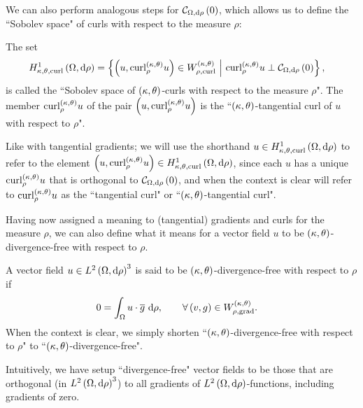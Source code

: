 We can also perform analogous steps for $\mathcal{C}_{ \Omega, \mathrm{d}\rho}\left( 0 \right)$, which allows us to define the ``Sobolev space" of curls with respect to the measure $\rho$:
\begin{definition} \label{def:CurlSobSpace}
	The set
	\begin{align*}
		H^1_{\kappa,\theta,\mathrm{curl}}\left( \Omega, \mathrm{d}\rho \right) &= \left\{  \left( u, \mathrm{curl}_{\rho}^{\left( \kappa, \theta \right)}u \right)\in W^{\left( \kappa, \theta \right)}_{\rho,\mathrm{curl}} \ \middle\vert \  \mathrm{curl}_{\rho}^{\left( \kappa, \theta \right)}u \perp \mathcal{C}_{ \Omega, \mathrm{d}\rho}\left( 0 \right)  \right\},
	\end{align*}
	is called the ``Sobolev space of $\left( \kappa, \theta \right)$-curls with respect to the measure $\rho$".
	The member $\mathrm{curl}_{\rho}^{\left( \kappa, \theta \right)}u$ of the pair $\left( u, \mathrm{curl}_{\rho}^{\left( \kappa, \theta \right)}u \right)$ is the ``$\left( \kappa, \theta \right)$-tangential curl of $u$ with respect to $\rho$".
\end{definition}
Like with tangential gradients; we will use the shorthand $u\in H^1_{\kappa,\theta,\mathrm{curl}}\left( \Omega, \mathrm{d}\rho \right)$ to refer to the element $\left( u, \mathrm{curl}_{\rho}^{\left( \kappa, \theta \right)}u \right)\in H^1_{\kappa,\theta,\mathrm{curl}}\left( \Omega, \mathrm{d}\rho \right)$, since each $u$ has a unique $\mathrm{curl}_{\rho}^{\left( \kappa, \theta \right)}u$ that is orthogonal to $\mathcal{C}_{ \Omega, \mathrm{d}\rho}\left( 0 \right)$, and when the context is clear will refer to $\mathrm{curl}_{\rho}^{\left( \kappa, \theta \right)}u$ as the ``tangential curl" or ``$\left( \kappa, \theta \right)$-tangential curl".

Having now assigned a meaning to (tangential) gradients and curls for the measure $\rho$, we can also define what it means for a vector field $u$ to be $\left( \kappa, \theta \right)$-divergence-free with respect to $\rho$.
\begin{definition} \label{def:ktDivFree}
	A vector field $u\in L^{2}\left( \Omega,\mathrm{d}\rho \right)^3$ is said to be $\left( \kappa, \theta \right)$-divergence-free with respect to $\rho$ if
	\begin{align*}
		0 &= \int_{\Omega} u\cdot\overline{g}  \ \mathrm{d}\rho, \qquad\forall\left( v,g \right)\in W^{\left( \kappa, \theta \right)}_{\rho,\mathrm{grad}}.
	\end{align*}
	When the context is clear, we simply shorten ``$\left( \kappa, \theta \right)$-divergence-free with respect to $\rho$" to ``$\left( \kappa, \theta \right)$-divergence-free".
\end{definition}
Intuitively, we have setup ``divergence-free" vector fields to be those that are orthogonal (in $L^{2}\left( \Omega,\mathrm{d}\rho \right)^3$) to all gradients of $L^{2}\left( \Omega,\mathrm{d}\rho \right)$-functions, including gradients of zero.

